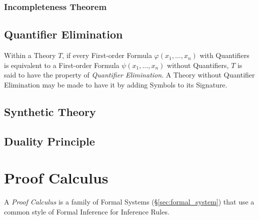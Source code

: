 \subsubsection{Incompleteness Theorem}\label{sec:incompleteness_theorem}



\subsection{Quantifier Elimination}\label{sec:quantifier_elimination}

Within a Theory $T$, if every First-order Formula $\varphi(x_1,
\ldots, x_n)$ with Quantifiers is equivalent to a First-order Formula
$\psi(x_1, \ldots, x_n)$ without Quantifiers, $T$ is said to have the
property of \emph{Quantifier Elimination}. A Theory without Quantifier
Elimination may be made to have it by adding Symbols to its Signature.



\subsection{Synthetic Theory}\label{sec:synthetic_theory}

\subsection{Duality Principle}\label{sec:duality_principle}





\section{Proof Calculus}\label{sec:proof_calculus}

A \emph{Proof Calculus} is a family of Formal Systems
(\S\ref{sec:formal_system}) that use a common style of Formal
Inference for Inference Rules.



